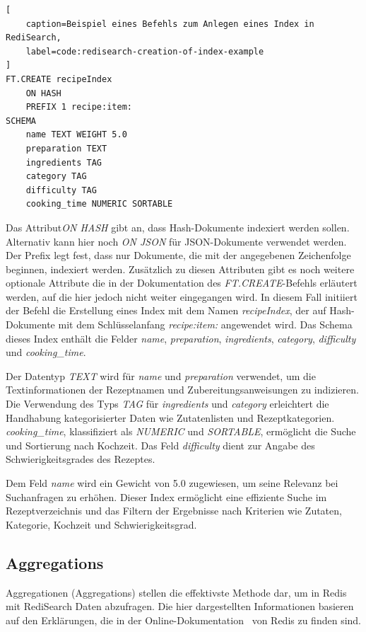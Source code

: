 \begin{lstlisting}[
    caption=Beispiel eines Befehls zum Anlegen eines Index in RediSearch,
    label=code:redisearch-creation-of-index-example
]
FT.CREATE recipeIndex
    ON HASH
    PREFIX 1 recipe:item:
SCHEMA
    name TEXT WEIGHT 5.0
    preparation TEXT
    ingredients TAG
    category TAG
    difficulty TAG
    cooking_time NUMERIC SORTABLE
\end{lstlisting}

Das Attribut\emph{ON HASH} gibt an, dass Hash-Dokumente indexiert werden sollen. Alternativ kann hier noch \emph{ON JSON} für JSON-Dokumente verwendet werden.
Der Prefix legt fest, dass nur Dokumente, die mit der angegebenen Zeichenfolge beginnen, indexiert werden. Zusätzlich zu diesen Attributen gibt es noch weitere optionale Attribute die in der Dokumentation des \emph{FT.CREATE}-Befehls erläutert werden, auf die hier jedoch nicht weiter eingegangen wird.
In diesem Fall initiiert der Befehl die Erstellung eines Index mit dem Namen \emph{recipeIndex}, der auf Hash-Dokumente mit dem Schlüsselanfang \emph{recipe:item:} angewendet wird. 
Das Schema dieses Index enthält die Felder \emph{name}, \emph{preparation}, \emph{ingredients}, \emph{category}, \emph{difficulty} und \emph{cooking\_time}.

Der Datentyp \emph{TEXT} wird für \emph{name} und \emph{preparation} verwendet, um die Textinformationen der Rezeptnamen und Zubereitungsanweisungen zu indizieren. Die Verwendung des Typs \emph{TAG} für \emph{ingredients} und \emph{category} erleichtert die Handhabung kategorisierter Daten wie Zutatenlisten und Rezeptkategorien. \emph{cooking\_time}, klassifiziert als \emph{NUMERIC} und \emph{SORTABLE}, ermöglicht die Suche und Sortierung nach Kochzeit. Das Feld \emph{difficulty} dient zur Angabe des Schwierigkeitsgrades des Rezeptes.

Dem Feld \emph{name} wird ein Gewicht von 5.0 zugewiesen, um seine Relevanz bei Suchanfragen zu erhöhen. Dieser Index ermöglicht eine effiziente Suche im Rezeptverzeichnis und das Filtern der Ergebnisse nach Kriterien wie Zutaten, Kategorie, Kochzeit und Schwierigkeitsgrad.

\subsection{Aggregations}
Aggregationen (Aggregations) stellen die effektivste Methode dar, um in Redis mit RediSearch Daten abzufragen. Die hier dargestellten Informationen basieren auf den Erklärungen, die in der Online-Dokumentation~\cite{redis_ltd_aggregations_nodate} von Redis zu finden sind.

